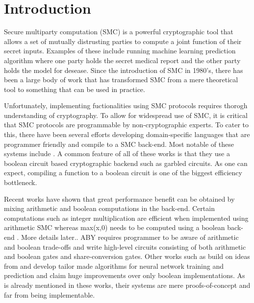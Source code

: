 \section{Introduction}
\label{sec:intro}

Secure multiparty computation \cite{yao,gmw} (SMC) is a powerful cryptographic tool that allows a set of mutually distrusting parties to compute a joint function of their secret inputs. Examples of these include running machine learning prediction algorithm where one party holds the secret medical report and the other party holds the model for desease. Since the introduction of SMC in 1980's, there has been a large body of work \cite{..} that has transformed SMC from a mere theoretical tool to something that can be used in practice. 

Unfortunately, implementing fuctionalities using SMC protocols requires thorogh understanding of cryptography. To allow for widespread use of SMC, it is critical that SMC protocols are programmable by non-cryptographic experts. To cater to this, there have been several efforts developing domain-specific languages that are programmer friendly and compile to a SMC back-end. Most notable of these systems include \cite{...}. A common feature of all of these works is that they use a boolean circuit based cryptographic backend such as garbled circuits. As one can expect, compiling a function to a boolean circuit is one of the biggest efficiency bottleneck. 

Recent works \cite{aby,secureml,minion} have shown that great performance benefit can be obtained by mixing arithmetic and boolean computations in the back-end. Certain computations such as integer multiplication are efficient when implemented using arithmetic SMC \cite{gmw} whereas max(x,0) needs to be computed using a boolean back-end \cite{yao}. More details later.. ABY \cite{aby} requires programmer to be aware of arithmetic and boolean trade-offs and  write high-level circuits consisting of both arithmetic and boolean gates and share-conversion gates. Other works such as \cite{secureml,minion} build on ideas from \cite{aby} and develop tailor made algorithms for neural network training and prediction \cite{ml} and claim huge improvements over only boolean implementations. As is already mentioned in these works, their systems are mere proofs-of-concept and far from being implementable.

